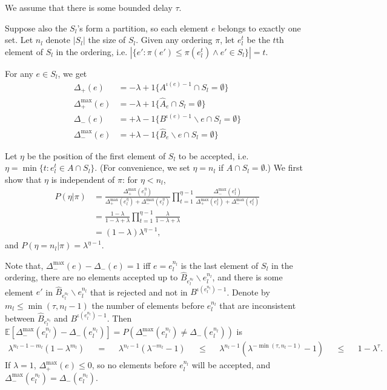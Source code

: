 We assume that there is some bounded delay $\tau$.

Suppose also the $S_l$'s form a partition, so each element $e$ belongs to exactly one set.
Let $n_l$ denote $|S_l|$ the size of $S_l$.
Given any ordering $\pi$, let $e_l^t$ be the $t$th element of $S_l$ in the ordering, i.e. $|\{e': \pi(e') \leq \pi(e_l^t) \wedge e'\in S_l\}| = t$.

For any $e \in S_l$, we get 
\begin{align*}
\Delta_+       (e) &= -\lambda + 1\{A^{\iota(e)-1}\cap S_l = \emptyset\}\\
\Delta_+^{\max}(e) &= -\lambda + 1\{\hat{A}_e\cap S_l = \emptyset\}\\
\Delta_-       (e) &= +\lambda - 1\{B^{\iota(e)-1}\backslash e\cap S_l = \emptyset\}\\
\Delta_-^{\max}(e) &= +\lambda - 1\{\hat{B}_e\backslash e\cap S_l = \emptyset\}
\end{align*}

Let $\eta$ be the position of the first element of $S_l$ to be accepted, i.e. $\eta = \min\{t : e_l^t \in A \cap S_l\}$.
(For convenience, we set $\eta = n_l$ if $A \cap S_l = \emptyset$.)
We first show that $\eta$ is independent of $\pi$: for $\eta < n_l$,
\begin{align*}
P(\eta|\pi)
&= \frac{\Delta_+^{\max}(e_l^\eta)}{\Delta_+^{\max}(e_l^\eta) + \Delta_-^{\max}(e_l^\eta)} \prod_{t=1}^{\eta-1} \frac{\Delta_-^{\max}(e_l^t)}{\Delta_+^{\max}(e_l^t) + \Delta_-^{\max}(e_l^t)}\\
&= \frac{1-\lambda}{1-\lambda+\lambda} \prod_{t=1}^{\eta-1} \frac{\lambda}{1-\lambda+\lambda}\\
&= (1-\lambda)\lambda^{\eta-1},
\end{align*}
and $P(\eta=n_l | \pi) = \lambda^{\eta-1}$.

Note that, $\Delta_-^{\max}(e)-\Delta_-(e) = 1$ iff $e=e_l^{n_l}$ is the last element of $S_l$ in the ordering, there are no elements accepted up to $\hat{B}_{e_l^{n_l}}\backslash e_l^{n_l}$, and there is some element $e'$ in $\hat{B}_{e_l^{n_l}}\backslash {e_l^{n_l}}$ that is rejected and not in $B^{\iota(e_l^{n_l})-1}$.
Denote by $m_l \leq \min(\tau,n_l-1)$ the number of elements before $e_l^{n_l}$ that are inconsistent between $\hat{B}_{e_l^{n_l}}$ and $B^{\iota(e_l^{n_l})-1}$.
Then $\mathbb{E}[\Delta_-^{\max}(e_l^{n_l}) - \Delta_-(e_l^{n_l})] = P(\Delta_-^{\max}(e_l^{n_l}) \neq \Delta_-(e_l^{n_l}))$ is
\begin{align*}
\lambda^{n_l-1-m_l}(1-\lambda^{m_l})
&&=&& \lambda^{n_l-1}(\lambda^{-m_l}-1)
&&\leq&& \lambda^{n_l-1}(\lambda^{-\min(\tau,n_l-1)}-1)
&&\leq&& 1 - \lambda^\tau.
\end{align*}
If $\lambda=1$, $\Delta_+^{\max}(e) \leq 0$, so no elements before $e_l^{n_l}$ will be accepted, and $\Delta_-^{\max}(e_l^{n_l}) = \Delta_-(e_l^{n_l})$.

